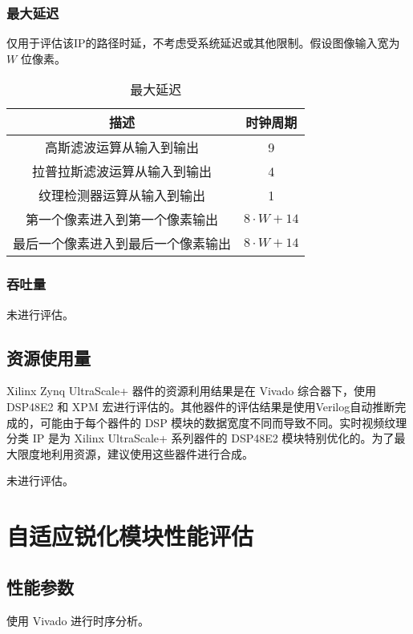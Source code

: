 \documentclass[12pt, a4paper, oneside]{ctexbook}
\begin{document}
		\subsection{最大延迟}
		仅用于评估该IP的路径时延，不考虑受系统延迟或其他限制。假设图像输入宽为 $W$ 位像素。
		\begin{table}[h]
			\centering
			\begin{tabular}{|c|c|}
				\hline
				\textbf{描述}       & \textbf{时钟周期}   \\ \hline
				高斯滤波运算从输入到输出      & 9               \\ \hline
				拉普拉斯滤波运算从输入到输出    & 4               \\ \hline
				纹理检测器运算从输入到输出     & 1               \\ \hline
				第一个像素进入到第一个像素输出   & $8\cdot W+14$   \\ \hline
				最后一个像素进入到最后一个像素输出 & $8\cdot W + 14$ \\ \hline
			\end{tabular}
		\caption{最大延迟}
		\end{table}
		\subsection{吞吐量}
		未进行评估。
	\section{资源使用量}
	Xilinx Zynq UltraScale+ 器件的资源利用结果是在 Vivado 综合器下，使用 DSP48E2 和 XPM 宏进行评估的。其他器件的评估结果是使用Verilog自动推断完成的，可能由于每个器件的 DSP 模块的数据宽度不同而导致不同。实时视频纹理分类 IP 是为 Xilinx UltraScale+ 系列器件的 DSP48E2 模块特别优化的。为了最大限度地利用资源，建议使用这些器件进行合成。\par 未进行评估。
	
	
	\chapter{自适应锐化模块性能评估}
	\section{性能参数}
	使用 Vivado 进行时序分析。
\end{document}
